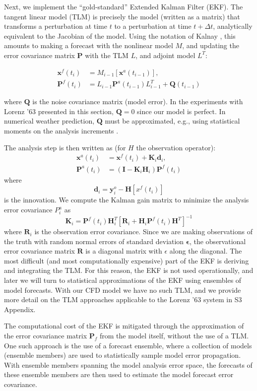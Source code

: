 \documentclass[10pt,letterpaper]{article}
\newcommand{\mbe}{\mathbf{\epsilon}}
\newcommand{\mbx}{\mathbf{x}}
\newcommand{\mby}{\mathbf{y}}
\newcommand{\mbd}{\mathbf{d}}
\newcommand{\mbR}{\mathbf{R}}
\newcommand{\mbH}{\mathbf{H}}
\newcommand{\mbK}{\mathbf{K}}
\newcommand{\mbP}{\mathbf{P}}
\begin{document}
Next, we implement the ``gold-standard'' Extended Kalman Filter (EKF).
The tangent linear model (TLM) is precisely the model (written as a matrix) that transforms a perturbation at time $t$ to a perturbation at time $t+\Delta t$, analytically equivalent to the Jacobian of the model.
Using the notation of Kalnay \cite{kalnay2003}, this amounts to making a forecast with the nonlinear model $M$, and updating the error covariance matrix $\mbP$ with the TLM $L$, and adjoint model $L^T$:

\begin{align*} \mbx^f (t_i) &= M _{i-1} [\mbx ^a (t_{i-1} ) ],\\
\mbP^f (t_i ) &= L_{i-1} \mbP^a (t_{i-1} ) L^T _{i-1} + \mathbf{Q} (t_{i-1} ) \end{align*}

where $\mathbf{Q}$ is the noise covariance matrix (model error).
In the experiments with Lorenz '63 presented in this section, $\mathbf{Q} = 0$ since our model is perfect.
In numerical weather prediction, $\mathbf{Q}$ must be approximated, e.g., using statistical moments on the analysis increments \cite{danforth2007estimating,li2009accounting,danforth2008using}.

The analysis step is then written as (for $H$ the observation operator):
\begin{align} \mbx^a (t_i ) &= \mbx^f (t_i) + \mbK_i \mbd_i,\\
\mbP^a (t_i) &= (\mathbf{I} - \mbK_i \mbH_i )\mbP^f (t_i) \end{align}
where
\[ \mbd_i = \mby_i^o - \mbH[x^f (t_i) ] \]
is the innovation. We compute the Kalman gain matrix to minimize the analysis error covariance $P^a _i$ as
\[ \mbK_i = \mbP^f (t_i) \mbH_i ^T [ \mbR_i + \mbH_i \mbP^f (t_i) \mbH^T ] ^{-1} \]
where $\mbR_i$ is the observation error covariance.
Since we are making observations of the truth with random normal errors of standard deviation $\mbe$, the observational error covariance matrix $\mbR$ is a diagonal matrix with $\epsilon$ along the diagonal.
The most difficult (and most computationally expensive) part of the EKF is deriving and integrating the TLM.
For this reason, the EKF is not used operationally, and later we will turn to statistical approximations of the EKF using ensembles of model forecasts.
With our CFD model we have no such TLM, and we provide more detail on the TLM approaches applicable to the Lorenz '63 system in S3 Appendix.

The computational cost of the EKF is mitigated through the approximation of the error covariance matrix $\mbP_f$ from the model itself, without the use of a TLM.
One such approach is the use of a forecast ensemble, where a collection of models (ensemble members) are used to statistically sample model error propagation.
With ensemble members spanning the model analysis error space, the forecasts of these ensemble members are then used to estimate the model forecast error covariance.
\end{document}
